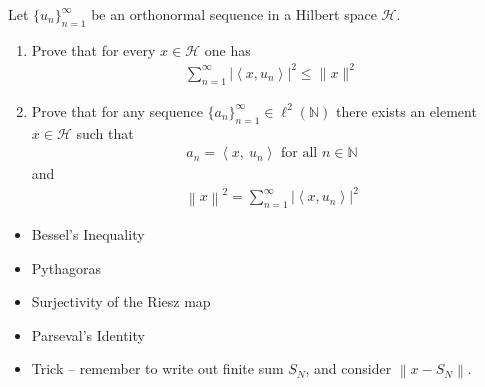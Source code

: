Let \(\{u_n\}_{n=1}^∞\) be an orthonormal sequence in a Hilbert space
\(\mathcal{H}\).

\begin{enumerate}
\def\labelenumi{\alph{enumi}.}
\item
  Prove that for every \(x ∈ \mathcal H\) one has
  \begin{align*}
  \displaystyle\sum_{n=1}^{\infty}\left|\left\langle x, u_{n}\right\rangle\right|^{2} \leq\|x\|^{2}
  \end{align*}
\item
  Prove that for any sequence
  \(\{a_n\}_{n=1}^\infty \in \ell^2({\mathbb{N}})\) there exists an
  element \(x\in\mathcal H\) such that
  \begin{align*}
  a_n = {\left\langle {x},~{u_n} \right\rangle} \text{ for all } n\in {\mathbb{N}}
  \end{align*}
  and
  \begin{align*}
  {\left\lVert {x} \right\rVert}^2 = \sum_{n=1}^{\infty}\left|\left\langle x, u_{n}\right\rangle\right|^{2}
  \end{align*}
\end{enumerate}

\begin{concept}

\envlist

\begin{itemize}
\tightlist
\item
  Bessel's Inequality
\item
  Pythagoras
\item
  Surjectivity of the Riesz map
\item
  Parseval's Identity
\item
  Trick -- remember to write out finite sum \(S_N\), and consider
  \({\left\lVert {x - S_N} \right\rVert}\).
\end{itemize}

\end{concept}

